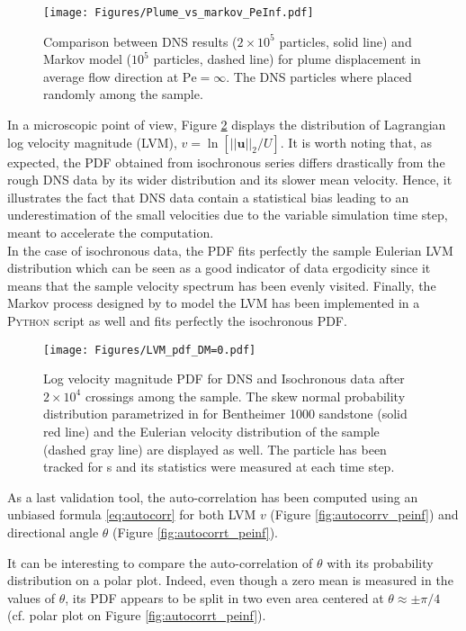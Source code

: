 \begin{figure}[h!]
	\centering
	\texttt{[image: Figures/Plume\_vs\_markov\_PeInf.pdf]}
	\caption{Comparison between DNS results ($2\times 10^5$ particles, solid line) and Markov model ($10^5$ particles, dashed line) for plume displacement in average flow direction at $\mathrm{Pe}=\infty$. The DNS particles where placed randomly among the sample.}
	\label{fig:plume_peinf}
\end{figure}

In a microscopic point of view, Figure \ref{fig:lvm_pdf_peinf} displays the distribution of Lagrangian log velocity magnitude (LVM), $v = \ln[||\textbf{u}||_2/U]$. 
It is worth noting that, as expected, the PDF obtained from isochronous series differs drastically from the rough DNS data by its wider distribution and its slower mean velocity.
Hence, it illustrates the fact that DNS data contain a statistical bias leading to an underestimation of the small velocities due to the variable simulation time step, meant to accelerate the computation.\\
In the case of isochronous data, the PDF fits perfectly the sample Eulerian LVM distribution which can be seen as a good indicator of data ergodicity since it means that the sample velocity spectrum has been evenly visited.
Finally, the Markov process designed by \cite{Meyer2016} to model the LVM has been implemented in a \textsc{Python} script as well and fits perfectly the isochronous PDF.

\begin{figure}
	\centering
	\texttt{[image: Figures/LVM\_pdf\_DM=0.pdf]}
	\caption{Log velocity magnitude PDF for DNS and Isochronous data after $2\times 10^4$ crossings among the sample. The skew normal probability distribution parametrized in \citet{Meyer2016} for Bentheimer 1000 sandstone (solid red line) and the Eulerian velocity distribution of the sample (dashed gray line) are displayed as well. The particle has been tracked for s and its statistics were measured at each time step.}
	\label{fig:lvm_pdf_peinf}
\end{figure}

As a last validation tool, the auto-correlation has been computed using an unbiased formula \eqref{eq:autocorr} for both LVM $v$ (Figure \ref{fig:autocorrv_peinf}) and directional angle $\theta$ (Figure \ref{fig:autocorrt_peinf}). 

It can be interesting to compare the auto-correlation of $\theta$ with its probability distribution on a polar plot. 
Indeed, even though a zero mean is measured in the values of $\theta$, its PDF appears to be split in two even area centered at $\theta\approx\pm\pi/4$ (cf. polar plot on Figure \ref{fig:autocorrt_peinf}).



